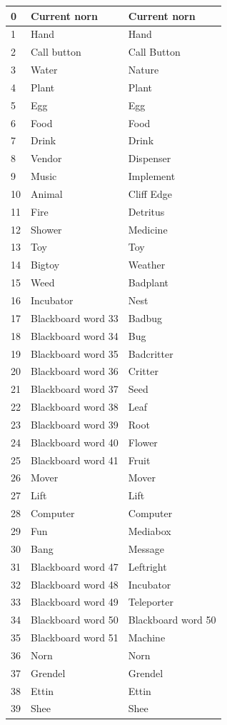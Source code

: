 \documentclass[11pt,twoside,a4paper]{article}
\begin{document}
\begin{longtable}{|p{}|p{}|p{}|}
0	&	Current norn		&	Current norn	 \\ \hline
1	&	Hand			&	Hand		 \\ \hline
2	&	Call button		&	Call Button	 \\ \hline
3	&	Water			&	Nature	 	 \\ \hline
4	&	Plant			&	Plant		 \\ \hline
5	&	Egg			&	Egg		 \\ \hline
6	&	Food			&	Food		 \\ \hline
7	&	Drink			&	Drink		 \\ \hline
8	&	Vendor			&	Dispenser	 \\ \hline
9	&	Music			&	Implement	 \\ \hline
10	&	Animal			&	Cliff Edge	 \\ \hline
11	&	Fire			&	Detritus	 \\ \hline
12	&	Shower			&	Medicine	 \\ \hline
13	&	Toy			&	Toy	 	 \\ \hline
14	&	Bigtoy			&	Weather	 	 \\ \hline
15	&	Weed			&	Badplant	 \\ \hline
16	&	Incubator		&	Nest		 \\ \hline
17	&	Blackboard word 33	&	Badbug		 \\ \hline
18	&	Blackboard word 34	&	Bug		 \\ \hline
19	&	Blackboard word 35	&	Badcritter	 \\ \hline
20	&	Blackboard word 36	&	Critter		 \\ \hline
21	&	Blackboard word 37	&	Seed		 \\ \hline
22	&	Blackboard word 38	&	Leaf		 \\ \hline
23	&	Blackboard word 39	&	Root		 \\ \hline
24	&	Blackboard word 40	&	Flower		 \\ \hline
25	&	Blackboard word 41	&	Fruit		 \\ \hline
26	&	Mover			&	Mover		 \\ \hline
27	&	Lift			&	Lift		 \\ \hline
28	&	Computer		&	Computer	 \\ \hline
29	&	Fun			&	Mediabox	 \\ \hline
30	&	Bang			&	Message		 \\ \hline
31	&	Blackboard word 47	&	Leftright	 \\ \hline
32	&	Blackboard word 48	&	Incubator	 \\ \hline
33	&	Blackboard word 49	&	Teleporter	 \\ \hline
34	&	Blackboard word 50	&	Blackboard word 50	 \\ \hline
35	&	Blackboard word 51	&	Machine		 \\ \hline
36	&	Norn			&	Norn		 \\ \hline
37	&	Grendel			&	Grendel		 \\ \hline
38	&	Ettin			&	Ettin		 \\ \hline
39	&	Shee			&	Shee		 \\ \hline


\end{longtable}
\end{document}

